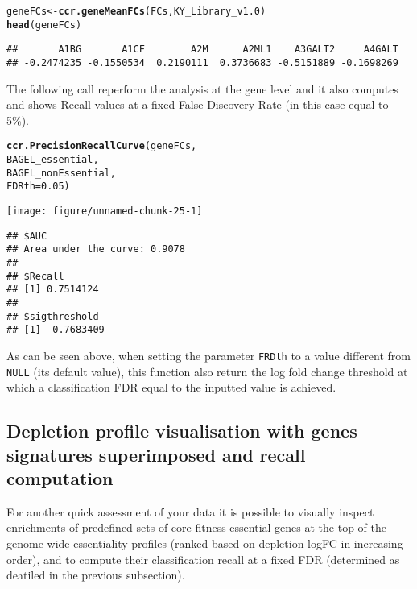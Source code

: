 \documentclass{article}\usepackage[]{graphicx}\usepackage[]{color}
\makeatletter
\def\maxwidth{ %
  \ifdim\Gin@nat@width>\linewidth
    \linewidth
  \else
    \Gin@nat@width
  \fi
}
\newcommand{\hlnum}[1]{\textcolor[rgb]{0.686,0.059,0.569}{#1}}%
\newcommand{\hlstd}[1]{\textcolor[rgb]{0.345,0.345,0.345}{#1}}%
\newcommand{\hlkwb}[1]{\textcolor[rgb]{0.69,0.353,0.396}{#1}}%
\newcommand{\hlkwc}[1]{\textcolor[rgb]{0.333,0.667,0.333}{#1}}%
\newcommand{\hlkwd}[1]{\textcolor[rgb]{0.737,0.353,0.396}{\textbf{#1}}}%
\newenvironment{kframe}{%
 \def\at@end@of@kframe{}%
 \ifinner\ifhmode%
  \def\at@end@of@kframe{\end{minipage}}%
  \begin{minipage}{\columnwidth}%
 \fi\fi%
 \def\FrameCommand##1{\hskip\@totalleftmargin \hskip-\fboxsep
 \colorbox{shadecolor}{##1}\hskip-\fboxsep
     \hskip-\linewidth \hskip-\@totalleftmargin \hskip\columnwidth}%
 \MakeFramed {\advance\hsize-\width
   \@totalleftmargin\z@ \linewidth\hsize
   \@setminipage}}%
 {\par\unskip\endMakeFramed%
 \at@end@of@kframe}
\newenvironment{knitrout}{}{} %
\makeatother
\begin{document}
\begin{knitrout}
\color{fgcolor}\begin{kframe}
\begin{alltt}
\hlstd{geneFCs}\hlkwb{<-}\hlkwd{ccr.geneMeanFCs}\hlstd{(FCs,KY_Library_v1.0)}
\hlkwd{head}\hlstd{(geneFCs)}
\end{alltt}
\begin{verbatim}
##       A1BG       A1CF        A2M      A2ML1    A3GALT2     A4GALT 
## -0.2474235 -0.1550534  0.2190111  0.3736683 -0.5151889 -0.1698269
\end{verbatim}
\end{kframe}
\end{knitrout}

The following call reperform the analysis at the gene level and it also computes and shows Recall values
at a fixed False Discovery Rate (in this case equal to 5\%).

\begin{knitrout}
\color{fgcolor}\begin{kframe}
\begin{alltt}
\hlkwd{ccr.PrecisionRecallCurve}\hlstd{(geneFCs,}
                         \hlstd{BAGEL_essential,}
                         \hlstd{BAGEL_nonEssential,}
                         \hlkwc{FDRth} \hlstd{=} \hlnum{0.05}\hlstd{)}
\end{alltt}
\end{kframe}
\texttt{[image: figure/unnamed-chunk-25-1]} 
\begin{kframe}\begin{verbatim}
## $AUC
## Area under the curve: 0.9078
## 
## $Recall
## [1] 0.7514124
## 
## $sigthreshold
## [1] -0.7683409
\end{verbatim}
\end{kframe}
\end{knitrout}

As can be seen above, when setting the parameter \texttt{FRDth} to a value different from \texttt{NULL}
(its default value), this function also return the log fold change threshold at which a classification FDR equal to the inputted value is achieved. 

\subsection{Depletion profile visualisation with genes signatures superimposed and recall computation}
For another quick assessment of your data it is possible to visually inspect enrichments of predefined sets of core-fitness essential genes at the top of the genome wide essentiality profiles (ranked based on depletion logFC in increasing order), and to compute their classification recall at a fixed FDR (determined as deatiled in the previous subsection).\\
\end{document}
